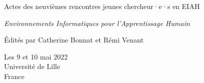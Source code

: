 \thispagestyle{empty}

\hspace{0pt}
\vfill

\logoConf[0.7]
\begin{center}
	\Huge{Actes des neuvièmes rencontres jeunes chercheur·e·s en EIAH}
	
	\vspace{0.7em}
	
	\Large{\textit{Environnements Informatiques pour l'Apprentissage Humain}}
	
	\vspace{0.7em}
	
	\begin{Large}
		Édités par Catherine Bonnat et Rémi Venant
	\end{Large}
	
	\begin{large}
		Les 9 et 10 mai 2022\\
		Université de Lille\\
		France
	\end{large}
\end{center}

\vfill
\hspace{0pt}

\restoregeometry